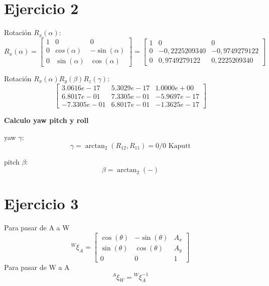 \documentclass[]{article}
\title{}
\author{}
\begin{document}
\maketitle

\begin{abstract}

\end{abstract}

\section*{Ejercicio 2}
Rotación $R_x(\alpha)$:
\begin{equation}
	R_x(\alpha) = \begin{bmatrix}
		1 & 0 & 0 \\ 
		0 & cos(\alpha) & -\sin(\alpha) \\ 0 & \sin(\alpha) & \cos(\alpha)
	\end{bmatrix} = \begin{bmatrix}
		1 & 0 & 0 \\
		0 & -0,2225209340 & -0,9749279122 \\ 
		0 & 0,9749279122 & 0,2225209340
	\end{bmatrix}
\end{equation}

Rotación $R_x(\alpha)R_y(\beta)R_z(\gamma)$:
\begin{equation}
	\begin{bmatrix}
		3.0616e-17 &  5.3029e-17  & 1.0000e+00 \\
		6.8017e-01 &  7.3305e-01 & -5.9697e-17 \\
		-7.3305e-01 &  6.8017e-01 & -1.3625e-17
	\end{bmatrix}
\end{equation}

\textbf{Calculo yaw pitch y roll}

yaw $\gamma$:
\begin{equation}
	\gamma = \arctan_2(R_{12},R_{11}) = 0/0 \text{~Kaputt}
\end{equation}

pitch $\beta$:
\begin{equation}
	\beta = \arctan_2(-)
\end{equation}

\section*{Ejercicio 3}

Para pasar de A a W
\begin{equation}
	{}^W\xi_A = \begin{bmatrix}
		\cos(\theta) & -\sin(\theta) & A_x \\
		\sin(\theta) & \cos(\theta) & A_y \\ 0 & 0 & 1
	\end{bmatrix}
\end{equation}
Para pasar de W a A
\begin{equation}
	{}^A\xi_W = {}^W\xi_A^{-1}
\end{equation}
\end{document}
